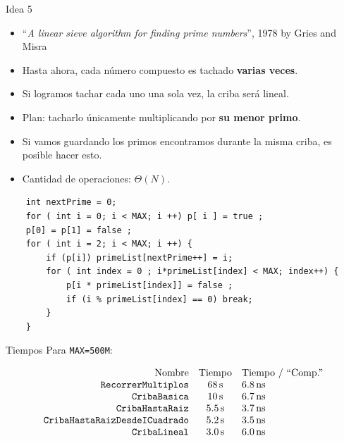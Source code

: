 \documentclass{beamer}
\begin{document}
\begin{frame}[fragile]{Idea 5}
  \begin{itemize}
      \item {\footnotesize ``\textit{A linear sieve algorithm for finding prime numbers}'', 1978 by Gries and Misra }
      \item Hasta ahora, cada número compuesto es tachado \textbf{varias veces}.
      \item Si logramos tachar cada uno una sola vez, la criba será lineal.
      \item Plan: tacharlo únicamente multiplicando por \textbf{su menor primo}.
      \item Si vamos guardando los primos encontramos durante la misma criba, es posible hacer esto.
      \item Cantidad de operaciones: $\Theta(N)$.
  \end{itemize}

\begin{lstlisting}
    int nextPrime = 0;
    for ( int i = 0; i < MAX; i ++) p[ i ] = true ;
    p[0] = p[1] = false ;
    for ( int i = 2; i < MAX; i ++) {
        if (p[i]) primeList[nextPrime++] = i;
        for ( int index = 0 ; i*primeList[index] < MAX; index++) {
            p[i * primeList[index]] = false ;
            if (i % primeList[index] == 0) break;
        }
    }
\end{lstlisting}
\end{frame}


\begin{frame}{Tiempos}
     Para \texttt{MAX=500M}:
     
     $$\begin{array}{rcl}
            \mbox{Nombre} & \mbox{Tiempo} & \mbox{Tiempo / ``Comp.''} \\
           \mbox{\texttt{RecorrerMultiplos}} & \SI{68}{\second} & \SI{6.8}{\nano \second} \\
           \mbox{\texttt{CribaBasica}} & \SI{10}{\second} & \SI{6.7}{\nano \second} \\
           \mbox{\texttt{CribaHastaRaiz}} & \SI{5.5}{\second} & \SI{3.7}{\nano \second} \\
           \mbox{\texttt{CribaHastaRaizDesdeICuadrado}} & \SI{5.2}{\second} & \SI{3.5}{\nano \second}  \\
           \mbox{\texttt{CribaLineal}} & \SI{3.0}{\second} & \SI{6.0}{\nano \second} \\
       \end{array}$$
\end{frame}
\end{document}
